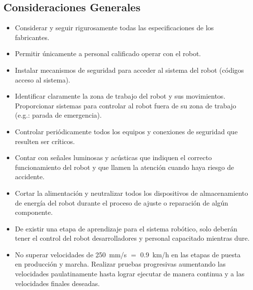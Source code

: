 \documentclass[withindex,glossary]{cam-thesis}
\begin{document}
\subsection{Consideraciones Generales}
\begin{itemize}
  \item Considerar y seguir rigurosamente todas las especificaciones de los fabricantes.
  \item Permitir únicamente a personal calificado operar con el robot.
  \item Instalar mecanismos de seguridad para acceder al sistema del robot (códigos acceso al sistema).
  \item Identificar claramente la zona de trabajo del robot y sus movimientos. Proporcionar sistemas para controlar al robot fuera de su zona de trabajo (e.g.: parada de emergencia).
  
  
  
  \item Controlar periódicamente todos los equipos y conexiones de seguridad que resulten ser críticos.
  \item Contar con señales luminosas y acústicas que indiquen el correcto funcionamiento del robot y que llamen la atención cuando haya riesgo de accidente.
  \item Cortar la alimentación y neutralizar todos los dispositivos de almacenamiento de energía del robot durante el proceso de ajuste o reparación de algún componente.
  \item De existir una etapa de aprendizaje para el sistema robótico, solo deberán tener el control del robot desarrolladores y personal capacitado mientras dure.
  \item No superar velocidades de \SI{250}{\milli\metre/\second} $=$ \SI{0.9}{\kilo\metre/\hour} en las etapas de puesta en producción y marcha. Realizar pruebas progresivas aumentando las velocidades paulatinamente hasta lograr ejecutar de manera continua y a las velocidades finales deseadas.
\end{itemize}
\end{document}
